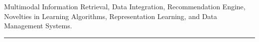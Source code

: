 {} Multimodal Information Retrieval, Data Integration, Recommendation Engine, Novelties in Learning Algorithms, Representation Learning, and Data Management Systems.\\
\noindent \rule{\linewidth}{2pt} 